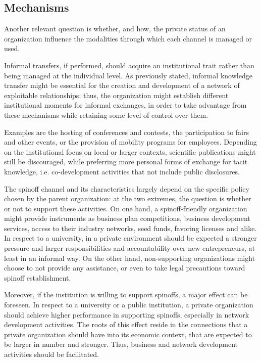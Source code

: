 \subsection{Mechanisms}

Another relevant question is whether, and how, the private status of an organization influence the modalities through which each channel is managed or used. 

Informal transfers, if performed, should acquire an institutional trait rather than being managed at the individual level. As previously stated, informal knowledge transfer might be essential for the creation and development of a network of exploitable relationships; thus, the organization might establish different institutional moments for informal exchanges, in order to take advantage from these mechanisms while retaining some level of control over them. 

Examples are the hosting of conferences and contests, the participation to fairs and other events, or the provision of mobility programs for employees. Depending on the institutional focus on local or larger contexts, scientific publications might still be discouraged, while preferring more personal forms of exchange for tacit knowledge, i.e. co-development activities that not include public disclosures. 

The spinoff channel and its characteristics largely depend on the specific policy chosen by the parent organization: at the two extremes, the question is whether or not to support these activities. On one hand, a spinoff-friendly organization might provide instruments as business plan competitions, business development services, access to their industry networks, seed funds, favoring licenses and alike. In respect to a university, in a private environment should be expected a stronger pressure and larger responsibilities and accountability over new entrepreneurs, at least in an informal way. On the other hand, non-supporting organizations might choose to not provide any assistance, or even to take legal precautions toward spinoff establishment.

Moreover, if the institution is willing to support spinoffs, a major effect can be foreseen. In respect to a university or a public institution, a private organization should achieve higher performance in supporting spinoffs, especially in network development activities. The roots of this effect reside in the connections that a private organization should have into its economic context, that are expected to be larger in number and stronger. Thus, business and network development activities should be facilitated.

